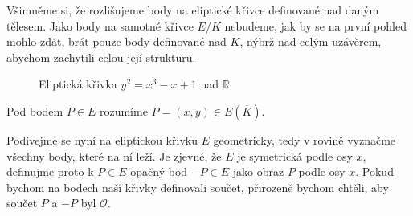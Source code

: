 \documentclass[12pt]{report}
\begin{document}
Všimněme si, že rozlišujeme body na eliptické křivce definované nad daným tělesem. Jako body na samotné křivce $E/K$ nebudeme, jak by se na první pohled mohlo zdát, brát pouze body definované nad $K$, nýbrž nad celým uzávěrem, abychom zachytili celou její strukturu.

\begin{figure}[h]
\begin{center}
\end{center}
\caption{Eliptická křivka $y^2 = x^3-x+1$ nad $\mathbb{R}$.}
\end{figure}


\begin{znaceni}
Pod bodem $P \in E$ rozumíme $P = (x,y) \in E(\overline{K})$.
\end{znaceni}

Podívejme se nyní na eliptickou křivku $E$ geometricky, tedy v rovině vyznačme všechny body, které na ní leží. Je zjevné, že $E$ je symetrická podle osy $x$, definujme proto k $P \in E$ opačný bod $-P \in E$ jako obraz $P$ podle osy $x$. Pokud bychom na bodech naší křivky definovali součet, přirozeně bychom chtěli, aby součet $P$ a $-P$ byl $\mathcal{O}$.
\end{document}
